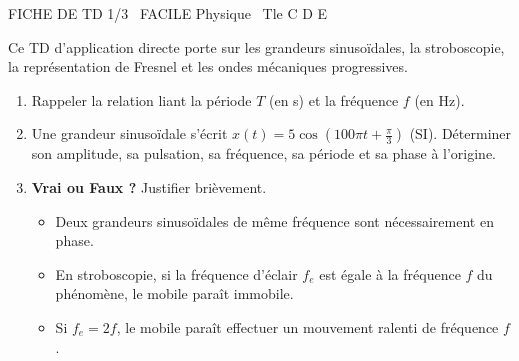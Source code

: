 \documentclass[11pt]{article}
\begin{document}
\begin{tcolorbox}[enhanced,colback=popink,colframe=popink,arc=10pt,boxrule=0pt,left=12pt,right=12pt,top=9pt,bottom=9pt]
{\color{white}\popxbold\small FICHE DE TD 1/3 \textbullet\ FACILE \hfill Physique \textbullet\ Tle C D E\par}
\end{tcolorbox}
\vspace{4pt}
Ce TD d'application directe porte sur les grandeurs sinusoïdales, la stroboscopie, la représentation de Fresnel et les ondes mécaniques progressives.

\begin{exercice}
\begin{enumerate}
    \item Rappeler la relation liant la période $T$ (en s) et la fréquence $f$ (en Hz).
    \item Une grandeur sinusoïdale s'écrit $x(t) = 5 \cos(100\pi t + \frac{\pi}{3})$ (SI). Déterminer son amplitude, sa pulsation, sa fréquence, sa période et sa phase à l'origine.
    \item \textbf{Vrai ou Faux ?} Justifier brièvement.
    \begin{itemize}
        \item[a)] Deux grandeurs sinusoïdales de même fréquence sont nécessairement en phase.
        \item[b)] En stroboscopie, si la fréquence d'éclair $f_e$ est égale à la fréquence $f$ du phénomène, le mobile paraît immobile.
        \item[c)] Si $f_e = 2f$, le mobile paraît effectuer un mouvement ralenti de fréquence $f$.
    \end{itemize}
\end{enumerate}
\end{exercice}
\end{document}
